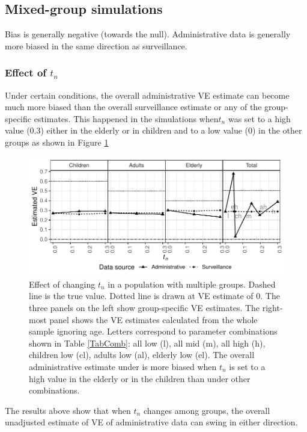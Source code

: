 \documentclass[11pt]{article}
\begin{document}
\pagebreak
%
\subsection{Mixed-group simulations}

Bias is generally negative (towards the null). Administrative data is generally more biased in the same direction as surveillance.

\subsubsection{Effect of $t_n$}

Under certain conditions, the overall administrative VE estimate can become much more biased than the overall surveillance estimate or any of the group-specific estimates. This happened in the simulations when$t_n$ was set to a high value (0.3) either in the elderly or in children and to a low value (0) in the other groups as shown in Figure \ref{agesmult-tn}

\begin{figure}[h]
	\centering
		\includegraphics[width=1\linewidth]{../fig-agesmult/agesmult-test_nonclin.pdf}
		\caption{
Effect of changing $t_n$ in a population with multiple groups. Dashed line is the true value. Dotted line is drawn at VE estimate of 0. The three panels on the left show group-specific VE estimates. The right-most panel shows the VE estimates calculated from the whole sample ignoring age. Letters correspond to parameter combinations shown in Table \ref{TabComb}: all low (l), all mid (m), all high (h), children low (cl), adults low (al), elderly low (el). The overall administrative estimate under is more biased when $t_n$ is set to a high value in the elderly or in the children than under other combinations. \label{agesmult-tn}
		}
\end{figure}

The results above show that when $t_n$ changes among groups, the overall unadjusted estimate of VE of administrative data can swing in either direction.
\end{document}

